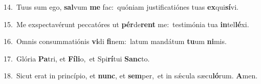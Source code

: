 {\numbfont\textcolor{\numbcolor}{14.}}~Tuus sum ego, \textbf{sal}\-vum \textbf{me} fac:~\star quóniam justificatiónes tuas \textbf{ex}\-qui\-\textbf{sí}\-vi.\par
{\numbfont\textcolor{\numbcolor}{15.}}~Me exspectavérunt peccatóres ut \textbf{pér}\-de\textbf{rent} me:~\star testimónia tua \textbf{in}\-tel\-\textbf{lé}\-xi.\par
{\numbfont\textcolor{\numbcolor}{16.}}~Omnis consummatiónis \textbf{vi}\-di \textbf{fi}\-nem:~\star latum mandátum \textbf{tu}\-um \textbf{ni}\-mis.\par
{\numbfont\textcolor{\numbcolor}{17.}}~Glória \textbf{Pa}\-tri, et \textbf{Fí}\-\textbf{li}o,~\star et Spi\-\textbf{rí}\-tui \textbf{Sanc}\-to.\par
{\numbfont\textcolor{\numbcolor}{18.}}~Sicut erat in princípio, et \textbf{nunc}\-, et \textbf{sem}\-per,~\star et in sǽcula sæcu\-\textbf{ló}\-rum. \textbf{A}\-men.\par

